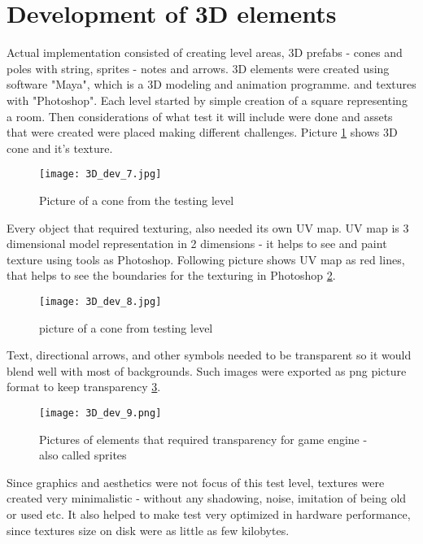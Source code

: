 \section{Development of 3D elements}
Actual implementation consisted of creating level areas, 3D prefabs - cones and poles with string, sprites - notes and arrows. 3D elements were created using software "Maya", which is a 3D modeling and animation programme. and textures with "Photoshop". Each level started by simple creation of a square representing a room. Then considerations of what test it will include were done and assets that were created were placed making different challenges. Picture \ref{3dDevelopment1} shows 3D cone and it's texture.
\begin{figure}[H]
\centering
\texttt{[image: 3D\_dev\_7.jpg]}
\caption{Picture of a cone from the testing level}
\label {3dDevelopment1}
\end{figure}
Every object that required texturing, also needed its own UV map. UV map is 3 dimensional model representation in 2 dimensions - it helps to see and paint texture using tools as Photoshop. Following picture shows UV map as red lines, that helps to see the boundaries for the texturing in Photoshop \ref{3dDevelopment2}.
\begin{figure}[H]
\centering
\texttt{[image: 3D\_dev\_8.jpg]}
\caption{picture of a cone from testing level}
\label {3dDevelopment2}
\end{figure}
Text, directional arrows, and other symbols needed to be transparent so it would blend well with most of backgrounds. Such images were exported as png picture format to keep transparency \ref {3dDevelopment3}. 
\begin{figure}[H]
\centering
\texttt{[image: 3D\_dev\_9.png]}
\caption{Pictures of elements that required transparency for game engine - also called sprites}
\label {3dDevelopment3}
\end{figure}
Since graphics and aesthetics were not focus of this test level, textures were created very minimalistic - without any shadowing, noise, imitation of being old or used etc. It also helped to make test very optimized in hardware performance, since textures size on disk were as little as few kilobytes.

